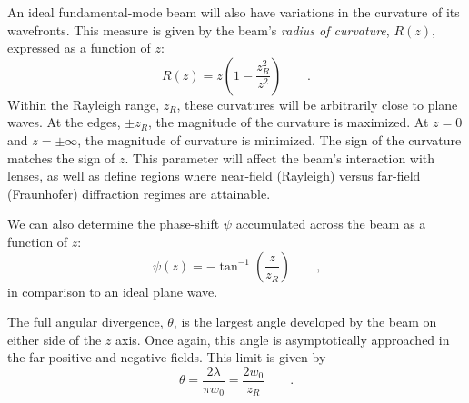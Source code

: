 \documentclass[a4paper,10pt]{report}
\numberwithin{equation}{section}
\begin{document}
An ideal fundamental-mode beam will also have variations in the curvature of its wavefronts. This measure is given by the beam's \emph{radius of curvature}, $R(z)$, expressed as a function of $z$:\cite[p.~12]{Marshall2004}
\begin{equation}\label{rz}
 R(z) = z \left(1 - \frac{z_R^2}{z^2} \right) \qquad \text{.}
\end{equation}
Within the Rayleigh range, $z_R$, these curvatures will be arbitrarily close to plane waves. At the edges, $\pm z_R$, the magnitude of the curvature is maximized. At $z=0$ and $z=\pm \infty$, the magnitude of curvature is minimized. The sign of the curvature matches the sign of $z$. This parameter will affect the beam's interaction with lenses, as well as define regions where near-field (Rayleigh) versus far-field (Fraunhofer) diffraction regimes are attainable. 

We can also determine the phase-shift $\psi$ accumulated across the beam as a function of $z$:\cite[p.~12]{Marshall2004}
\begin{equation}\label{psiz}
 \psi(z) = -\tan^{-1}\left(\frac{z}{z_R}\right) \qquad \text{,}
\end{equation}
in comparison to an ideal plane wave. 

The full angular divergence, $\theta$, is the largest angle developed by the beam on either side of the $z$ axis. Once again, this angle is asymptotically approached in the far positive and negative fields. This limit is given by \cite[p.~12]{Marshall2004}
\begin{equation}\label{fadiv}
 \theta = \frac{2\lambda}{\pi w_0} = \frac{2w_0}{z_R} \qquad \text{.}
\end{equation}
\end{document}
